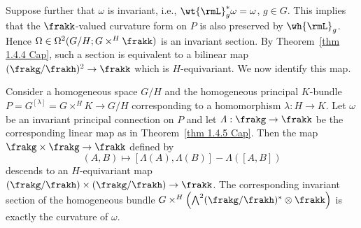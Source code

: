 Suppose further that $\omega$ is invariant, i.e., $\wt{\rmL}_g^\ast \omega=\omega$, $g\in G$. This implies that the $\frakk$-valued curvature form on $P$ is also preserved by $\wh{\rmL}_g$. Hence $\Omega\in\Omega^2(G\slash H;G\times^H \frakk)$ is an invariant section. By Theorem~\ref{thm 1.4.4 Cap}, such a section is equivalent to a bilinear map $(\frakg\slash\frakh)^2\to\frakk$ which is $H$-equivariant. We now identify this map.
\begin{prop}\label{prop 1.4.6 Cap}
    Consider a homogeneous space $G\slash H$ and the homogeneous principal $K$-bundle $P=G^{[\lambda]}=G\times^H K\to G\slash H$ corresponding to a homomorphism $\lambda:H\to K$. Let $\omega$ be an invariant principal connection on $P$ and let $\varLambda:\frakg\to \frakk$ be the corresponding linear map as in Theorem~\ref{thm 1.4.5 Cap}. Then the map $\frakg\times\frakg\to\frakk$ defined by 
    \[(A,B)\mapsto [\varLambda(A),\varLambda(B)]-\varLambda([A,B])\]
    descends to an $H$-equivariant map $(\frakg\slash\frakh)\times(\frakg\slash\frakh)\to \frakk$. The corresponding invariant section of the homogeneous bundle $G\times^H \left(\bigwedge^2(\frakg\slash\frakh)^\ast\otimes\frakk\right)$ is exactly the curvature of $\omega$.
\end{prop}
